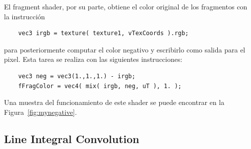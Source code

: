 El fragment shader, por su parte, obtiene el color original de los fragmentos
con la instrucción

\begin{verbatim}
    vec3 irgb = texture( texture1, vTexCoords ).rgb;
\end{verbatim}

para posteriormente computar el color negativo y escribirlo como salida para el
pixel. Esta tarea se realiza con las siguientes instrucciones:

\begin{verbatim}
    vec3 neg = vec3(1.,1.,1.) - irgb;
    fFragColor = vec4( mix( irgb, neg, uT ), 1. );
\end{verbatim}

Una muestra del funcionamiento de este shader se puede encontrar en la
Figura~\ref{fig:mynegative}.

% 

\subsection{Line Integral Convolution}
\label{makereference5.5.8}

